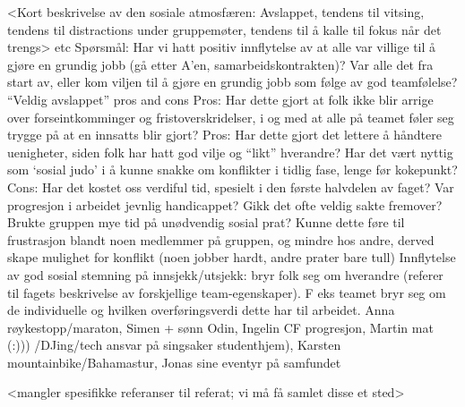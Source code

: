 <Kort beskrivelse av den sosiale atmosfæren: Avslappet, tendens til vitsing, tendens til distractions under gruppemøter, tendens til å kalle til fokus når det trengs>
etc
Spørsmål:
Har vi hatt positiv innflytelse av at alle var villige til å gjøre en grundig jobb (gå etter A’en, samarbeidskontrakten)?
Var alle det fra start av, eller kom viljen til å gjøre en grundig jobb som følge av god teamfølelse?
“Veldig avslappet” pros and cons
Pros: Har dette gjort at folk ikke blir arrige over forseintkomminger og fristoverskridelser, i og med at alle på teamet føler seg trygge på at en innsatts blir gjort? 
Pros: Har dette gjort det lettere å håndtere uenigheter, siden folk har hatt god vilje og “likt” hverandre?
Har det vært nyttig som ‘sosial judo’ i å kunne snakke om konflikter i tidlig fase, lenge før kokepunkt?
Cons: Har det kostet oss verdiful tid, spesielt i den første halvdelen av faget? Var progresjon i arbeidet jevnlig handicappet? Gikk det ofte veldig sakte fremover? Brukte gruppen mye tid på unødvendig sosial prat? Kunne dette føre til frustrasjon blandt noen medlemmer på gruppen, og mindre hos andre, derved skape mulighet for konflikt (noen jobber hardt, andre prater bare tull)
Innflytelse av god sosial stemning på innsjekk/utsjekk: bryr folk seg om hverandre (referer til fagets beskrivelse av forskjellige team-egenskaper). F eks teamet bryr seg om de individuelle og hvilken overføringsverdi dette har til arbeidet.
 Anna røykestopp/maraton, Simen + sønn Odin, Ingelin CF progresjon, Martin mat (:))) /DJing/tech ansvar på singsaker studenthjem), Karsten mountainbike/Bahamastur, Jonas sine eventyr på samfundet 

<mangler spesifikke referanser til referat; vi må få samlet disse et sted>
